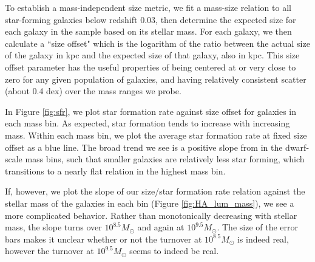 \documentclass[iop]{emulateapj}
\begin{document}
To establish a mass-independent size metric, we fit a mass-size relation to all star-forming galaxies below redshift 0.03, then determine the expected size for each galaxy in the sample based on its stellar mass. For each galaxy, we then calculate a ``size offset" which is the logarithm of the ratio between the actual size of the galaxy in kpc and the expected size of that galaxy, also in kpc. This size offset parameter has the useful properties of being centered at or very close to zero for any given population of galaxies, and having relatively consistent scatter (about 0.4 dex) over the mass ranges we probe.


In Figure \ref{fig:sfr}, we plot star formation rate against size offset for galaxies in each mass bin. As expected, star formation tends to increase with increasing mass. Within each mass bin, we plot the average star formation rate at fixed size offset as a blue line. The broad trend we see is a positive slope from in the dwarf-scale mass bins, such that smaller galaxies are relatively less star forming, which transitions to a nearly flat relation in the highest mass bin.

If, however, we plot the slope of our size/star formation rate relation against the stellar mass of the galaxies in each bin (Figure \ref{fig:HA_lum_mass}), we see a more complicated behavior. Rather than monotonically decreasing with stellar mass, the slope turns over $10^{8.5} M_{\odot}$  and again at $10^{9.5} M_{\odot}$. The size of the error bars makes it unclear whether or not the turnover at $10^{8.5} M_{\odot}$ is indeed real, however the turnover at $10^{9.5} M_{\odot}$ seems to indeed be real.
\end{document}
